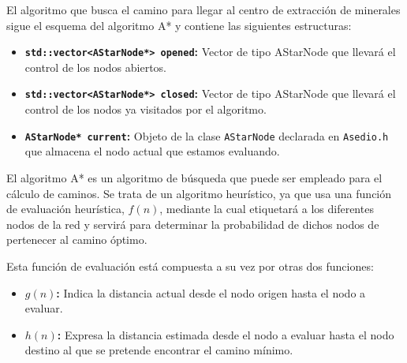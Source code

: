 El algoritmo que busca el camino para llegar al centro de extracción de minerales sigue el esquema del algoritmo A* y contiene las siguientes estructuras:
\begin{itemize}
	\item \textbf{\texttt{std::vector<AStarNode*> opened}:} Vector de tipo AStarNode que llevará el control de los nodos abiertos.
	\item \textbf{\texttt{std::vector<AStarNode*> closed}:} Vector de tipo AStarNode que llevará el control de los nodos ya visitados por el algoritmo.
	\item \textbf{\texttt{AStarNode* current}:} Objeto de la clase \texttt{AStarNode} declarada en \texttt{Asedio.h} que almacena el nodo actual que estamos evaluando.
\end{itemize}
El algoritmo A* es un algoritmo de búsqueda que puede ser empleado para el cálculo de caminos. Se trata de un algoritmo heurístico, ya que usa una función de evaluación heurística, $f(n)$, mediante la cual etiquetará a los diferentes nodos de la red y servirá para determinar la probabilidad de dichos nodos de pertenecer al camino óptimo.

Esta función de evaluación está compuesta a su vez por otras dos funciones:
\begin{itemize}
	\item \textbf{$g(n)$:} Indica la distancia actual desde el nodo origen hasta el nodo a evaluar.
	\item \textbf{$h(n)$:} Expresa la distancia estimada desde el nodo a evaluar hasta el nodo destino al que se pretende encontrar el camino mínimo.
\end{itemize}